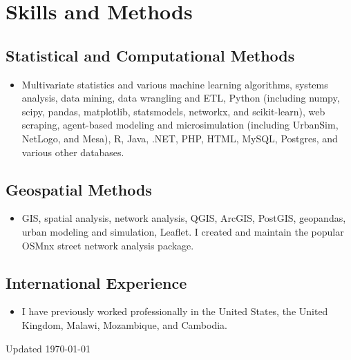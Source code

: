 \documentclass{academiccv}
\begin{document}
\section*{Skills and Methods}

\subsection*{Statistical and Computational Methods}

\begin{itemize}
\item Multivariate statistics and various machine learning algorithms, systems analysis, data mining, data wrangling and ETL, Python (including numpy, scipy, pandas, matplotlib, statsmodels, networkx, and scikit-learn), web scraping, agent-based modeling and microsimulation (including UrbanSim, NetLogo, and Mesa), R, Java, .NET, PHP, HTML, MySQL, Postgres, and various other databases.
\end{itemize}

\subsection*{Geospatial Methods}

\begin{itemize}
\item GIS, spatial analysis, network analysis, QGIS, ArcGIS, PostGIS, geopandas, urban modeling and simulation, Leaflet. I created and maintain the popular OSMnx street network analysis package.
\end{itemize}

\subsection*{International Experience}

\begin{itemize}
\item I have previously worked professionally in the United States, the United Kingdom, Malawi, Mozambique, and Cambodia.
\end{itemize}



\begin{center}
\vspace{6em}
Updated \monthyeardate\today
\end{center}
\end{document}
